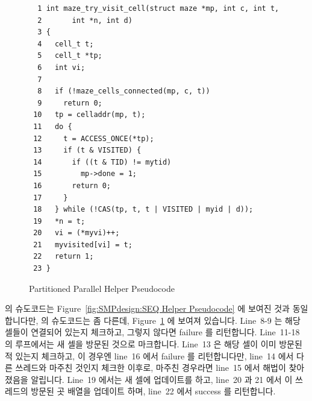 \begin{figure}[tbp]
{ \scriptsize
\begin{verbatim}
  1 int maze_try_visit_cell(struct maze *mp, int c, int t,
  2       int *n, int d)
  3 {
  4   cell_t t;
  5   cell_t *tp;
  6   int vi;
  7 
  8   if (!maze_cells_connected(mp, c, t))
  9     return 0;
 10   tp = celladdr(mp, t);
 11   do {
 12     t = ACCESS_ONCE(*tp);
 13     if (t & VISITED) {
 14       if ((t & TID) != mytid)
 15         mp->done = 1;
 16       return 0;
 17     }
 18   } while (!CAS(tp, t, t | VISITED | myid | d));
 19   *n = t;
 20   vi = (*myvi)++;
 21   myvisited[vi] = t;
 22   return 1;
 23 }
\end{verbatim}
}
\caption{Partitioned Parallel Helper Pseudocode}
\label{fig:SMPdesign:Partitioned Parallel Helper Pseudocode}
\end{figure}

 의 슈도코드는
Figure~\ref{fig:SMPdesign:SEQ Helper Pseudocode} 에 보여진 것과 동일합니다만,
 의 슈도코드는 좀 다른데,
Figure~\ref{fig:SMPdesign:Partitioned Parallel Helper Pseudocode} 에 보여져
있습니다.
Line~8-9 는 해당 셀들이 연결되어 있는지 체크하고, 그렇지 않다면 failure 를
리턴합니다.
Line~11-18 의 루프에서는 새 셀을 방문된 것으로 마크합니다.
Line~13 은 해당 셀이 이미 방문된 적 있는지 체크하고, 이 경우엔 line~16 에서
failure 를 리턴합니다만, line~14 에서 다른 쓰레드와 마주친 것인지 체크한
이후로, 마주친 경우라면 line~15 에서 해법이 찾아졌음을 알립니다.
Line~19 에서는 새 셀에 업데이트를 하고, line~20 과 21 에서 이 쓰레드의 방문된
곳 배열을 업데이트 하며, line~22 에서 success 를 리턴합니다.

